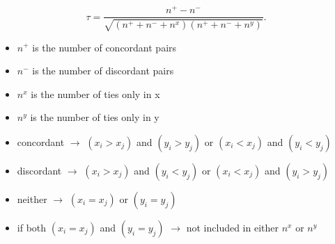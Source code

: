 \begin{equation}\label{eq:kendall}
	\tau = \frac{n^+-n^-}{\sqrt{(n^++n^-+n^x)(n^++n^-+n^y)}}.
\end{equation}
\begin{itemize}
	\item $ n^+ $ is the number of concordant pairs
	\item $ n^- $ is the number of discordant pairs
	\item $ n^x $ is the number of ties only in x
	\item $ n^y $ is the number of ties only in y
	\item concordant $\rightarrow $ $ (x_i > x_j ) $ and $ (y_i > y_j ) $ or $ (x_i < x_j ) $ and $ (y_i < y_j ) $
	\item discordant $\rightarrow $ $ (x_i > x_j ) $ and $ (y_i < y_j ) $ or $ (x_i < x_j ) $ and $ (y_i > y_j ) $
	\item neither $\rightarrow $ $ (x_i = x_j ) $ or $ (y_i = y_j ) $
	\item if both $ (x_i = x_j ) $ and $ (y_i = y_j ) $ $\rightarrow $ not included in either $ n^x $ or $ n^y $
\end{itemize}




